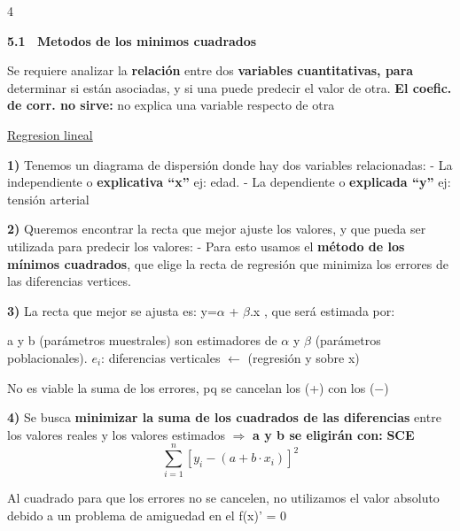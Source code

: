 \documentclass[10pt,a4paper,landscape]{article}
\newcommand{\chico}{\fontsize{4.2}{4.6}\selectfont}
\newcommand{\tema}[1]{%
  \par\vspace{2pt}%
  \noindent\colorbox{black!16}{\parbox{\dimexpr\linewidth-2\fboxsep\relax}{%
    \fontsize{5.7}{6.6}\selectfont\bfseries #1\strut}}%
  \par\vspace{0.8pt}}
\newcommand{\fit}[1]{\resizebox{\ifdim\width>\linewidth\linewidth\else\width\fi}{!}{#1}}
\newcommand{\fitm}[1]{\par\vspace{0.3pt}\centerline{\fit{$\displaystyle #1$}}\vspace{0.3pt}}
\let\origsum\sum
\renewcommand{\sum}{\mathop{\textstyle\origsum}\limits}
\begin{document}
\begin{multicols}{4}
\tema{5.1 \ Metodos de los minimos cuadrados}

Se requiere analizar la \textbf{relación} entre dos \textbf{variables cuantitativas, para} determinar si están asociadas, y si una puede predecir el valor de otra. \textbf{El coefic. de corr. no sirve:} no explica una variable respecto de otra

\uline{Regresion lineal}

\textbf{1)} Tenemos un diagrama de dispersión donde hay dos variables relacionadas: - La independiente o \textbf{explicativa ``x''} ej: edad. - La dependiente o \textbf{explicada ``y''} ej: tensión arterial

\textbf{2)} Queremos encontrar la recta que mejor ajuste los valores, y que pueda ser utilizada para predecir los valores: - Para esto usamos el \textbf{método de los mínimos cuadrados}, que elige la recta de regresión que minimiza los errores de las diferencias vertices.

\textbf{3)} La recta que mejor se ajusta es: y=$\alpha$ + $\beta$.x , que será estimada por:
\fitm{\widehat{y} = a + b\cdot x \qquad\qquad e_i = y_i - \widehat{y}_i}
a y b (parámetros muestrales) son estimadores de $\alpha$ y $\beta$ (parámetros poblacionales). $e_i$: diferencias verticales $\longleftarrow$ (regresión y sobre x)

No es viable la suma de los errores, pq se cancelan los (+) con los ($-$)

\textbf{4)} Se busca \textbf{minimizar la suma de los cuadrados de las diferencias} entre los valores reales y los valores estimados $\Rightarrow$ \textbf{a y b se eligirán con:} \hfill \textbf{SCE}
\[
\sum_{i=1}^{n} \left[ y_i - \left(a+b\cdot x_i\right) \right]^2
\]
{\chico Al cuadrado para que los errores no se cancelen, no utilizamos el valor absoluto debido a un problema de amiguedad en el f(x)' = 0\par}


\end{multicols}
\end{document}
